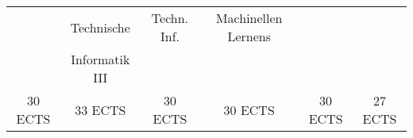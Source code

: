 \begin{table}[htbp]
{\begin{tabular}{|cccccc|}
\multicolumn{1}{|c|}{}             & \multicolumn{1}{c|}{Technische}     & \multicolumn{1}{c|}{Techn. Inf.}    & \multicolumn{1}{c|}{Machinellen Lernens} & \multicolumn{1}{c|}{}            &                \\ \cline{1-1} \cline{3-5}
\multicolumn{1}{|c|}{}             & \multicolumn{1}{c|}{Informatik III} & \multicolumn{1}{c|}{}               & \multicolumn{1}{c|}{}                    & \multicolumn{1}{c|}{}            &                \\ \hline
30 ECTS                            & 33 ECTS                             & 30 ECTS                             & 30 ECTS                                  & 30 ECTS                          & 27 ECTS        \\ \hline
\end{tabular}}
\end{table}
